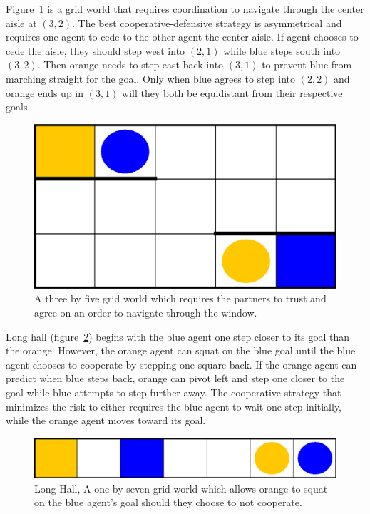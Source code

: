 \documentclass[letterpaper]{article}
\begin{document}
Figure~\ref{fig:threebyfivewindow} is a grid world that requires coordination to navigate through the center aisle at $(3,2)$. The best cooperative-defensive strategy is asymmetrical and requires one agent to cede to the other agent the center aisle. If agent chooses to cede the aisle, they should step west into $(2,1)$ while blue steps south into $(3,2)$. Then orange needs to step east back into $(3,1)$ to prevent blue from marching straight for the goal. Only when blue agrees to step into $(2,2)$ and orange ends up in $(3,1)$ will they both be equidistant from their respective goals.

\begin{figure}
\centering
\includegraphics[width=0.8\columnwidth]{figures/threebyfivewindow.png}
\caption{A three by five grid world which requires the partners to trust and agree on an order to navigate through the window.}
\label{fig:threebyfivewindow}
\end{figure}





Long hall (figure~\ref{fig:longhallway}) begins with the blue agent one step closer to its goal than the orange. However, the orange agent can squat on the blue goal until the blue agent chooses to cooperate by stepping one square back. If the orange agent can predict when blue steps back, orange can pivot left and step one closer to the goal while blue attempts to step further away. The cooperative strategy that minimizes the risk to either requires the blue agent to wait one step initially, while the orange agent moves toward its goal.

\begin{figure}
\centering
\includegraphics[width=0.8\columnwidth]{figures/longhallway.png}
\caption{Long Hall, A one by seven grid world which allows orange to squat on the blue agent's goal should they choose to not cooperate.}
\label{fig:longhallway}
\end{figure}
\end{document}
